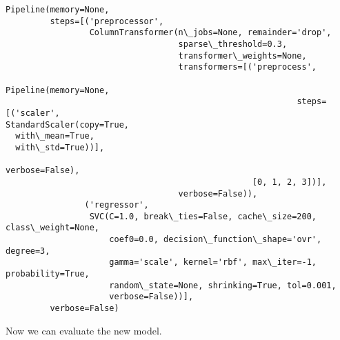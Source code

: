 \documentclass[11pt]{article}
\begin{document}
    \begin{Verbatim}[commandchars=\\\{\}]
Pipeline(memory=None,
         steps=[('preprocessor',
                 ColumnTransformer(n\_jobs=None, remainder='drop',
                                   sparse\_threshold=0.3,
                                   transformer\_weights=None,
                                   transformers=[('preprocess',
                                                  Pipeline(memory=None,
                                                           steps=[('scaler',
StandardScaler(copy=True,
  with\_mean=True,
  with\_std=True))],
                                                           verbose=False),
                                                  [0, 1, 2, 3])],
                                   verbose=False)),
                ('regressor',
                 SVC(C=1.0, break\_ties=False, cache\_size=200, class\_weight=None,
                     coef0=0.0, decision\_function\_shape='ovr', degree=3,
                     gamma='scale', kernel='rbf', max\_iter=-1, probability=True,
                     random\_state=None, shrinking=True, tol=0.001,
                     verbose=False))],
         verbose=False)
    \end{Verbatim}

    Now we can evaluate the new model.
\end{document}
